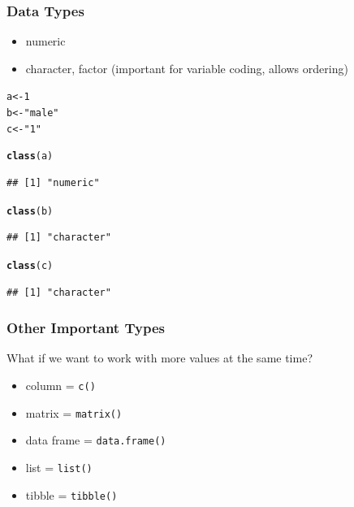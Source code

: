 \documentclass[12pt]{beamer}\usepackage[]{graphicx}\usepackage[]{color}
\makeatletter
\newcommand{\hlnum}[1]{\textcolor[rgb]{0.686,0.059,0.569}{#1}}%
\newcommand{\hlstr}[1]{\textcolor[rgb]{0.192,0.494,0.8}{#1}}%
\newcommand{\hlstd}[1]{\textcolor[rgb]{0.345,0.345,0.345}{#1}}%
\newcommand{\hlkwb}[1]{\textcolor[rgb]{0.69,0.353,0.396}{#1}}%
\newcommand{\hlkwd}[1]{\textcolor[rgb]{0.737,0.353,0.396}{\textbf{#1}}}%
\newenvironment{kframe}{%
 \def\at@end@of@kframe{}%
 \ifinner\ifhmode%
  \def\at@end@of@kframe{\end{minipage}}%
  \begin{minipage}{\columnwidth}%
 \fi\fi%
 \def\FrameCommand##1{\hskip\@totalleftmargin \hskip-\fboxsep
 \colorbox{shadecolor}{##1}\hskip-\fboxsep
     \hskip-\linewidth \hskip-\@totalleftmargin \hskip\columnwidth}%
 \MakeFramed {\advance\hsize-\width
   \@totalleftmargin\z@ \linewidth\hsize
   \@setminipage}}%
 {\par\unskip\endMakeFramed%
 \at@end@of@kframe}
\newenvironment{knitrout}{}{} %
\makeatother
\begin{document}
\begin{frame}[fragile]
\frametitle{Data Types}

\begin{itemize}
 \item numeric
 \item character, factor (important for variable coding, allows ordering)
\end{itemize}

\begin{small}
\begin{knitrout}\footnotesize
{}\color{fgcolor}\begin{kframe}
\begin{alltt}
\hlstd{a} \hlkwb{<-} \hlnum{1}
\hlstd{b} \hlkwb{<-} \hlstr{"male"}
\hlstd{c} \hlkwb{<-} \hlstr{"1"}

\hlkwd{class}\hlstd{(a)}
\end{alltt}
\begin{verbatim}
## [1] "numeric"
\end{verbatim}
\begin{alltt}
\hlkwd{class}\hlstd{(b)}
\end{alltt}
\begin{verbatim}
## [1] "character"
\end{verbatim}
\begin{alltt}
\hlkwd{class}\hlstd{(c)}
\end{alltt}
\begin{verbatim}
## [1] "character"
\end{verbatim}
\end{kframe}
\end{knitrout}
\end{small}

\end{frame}


\begin{frame}\large
\frametitle{Other Important Types}
What if we want to work with more values at the same time?
\begin{itemize}
 \item column = \texttt{c()}
 \item matrix = \texttt{matrix()}
 \item data frame = \texttt{data.frame()}
 \item list = \texttt{list()}
 \item tibble = \texttt{tibble()}
\end{itemize}
\end{frame}
\end{document}
